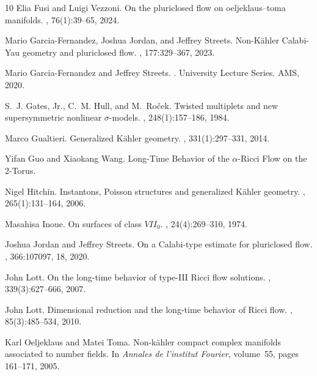 \documentclass[12pt]{amsart}
\numberwithin{equation}{section}
\numberwithin{prop}{section}
\theoremstyle{definition}
\begin{document}
\begin{thebibliography}{10}
Elia Fusi and Luigi Vezzoni.
\newblock On the pluriclosed flow on oeljeklaus--toma manifolds.
, 76(1):39--65, 2024.

Mario Garcia-Fernandez, Joshua Jordan, and Jeffrey Streets.
\newblock Non-K{\"a}hler Calabi-Yau geometry and pluriclosed flow.
, 177:329--367, 2023.

Mario Garcia-Fernandez and Jeffrey Streets.
.
\newblock University Lecture Series. AMS, 2020.

S.~J. Gates, Jr., C.~M. Hull, and M.~Ro\v{c}ek.
\newblock Twisted multiplets and new supersymmetric nonlinear {$\sigma$}-models.
, 248(1):157--186, 1984.

Marco Gualtieri.
\newblock Generalized {K}\"ahler geometry.
, 331(1):297--331, 2014.

Yifan Guo and Xiaokang Wang.
\newblock Long-Time Behavior of the $\alpha$-Ricci Flow on the 2-Torus.

Nigel Hitchin.
\newblock Instantons, {P}oisson structures and generalized {K}\"ahler geometry.
, 265(1):131--164, 2006.

Masahisa Inoue.
\newblock On surfaces of class $VII_0$.
, 24(4):269--310, 1974.

Joshua Jordan and Jeffrey Streets.
\newblock On a {C}alabi-type estimate for pluriclosed flow.
, 366:107097, 18, 2020.

John Lott.
\newblock On the long-time behavior of type-{III} {R}icci flow solutions.
, 339(3):627--666, 2007.

John Lott.
\newblock Dimensional reduction and the long-time behavior of {R}icci flow.
, 85(3):485--534, 2010.

Karl Oeljeklaus and Matei Toma.
\newblock Non-k{\"a}hler compact complex manifolds associated to number fields.
\newblock In {\em Annales de l'institut Fourier}, volume~55, pages 161--171, 2005.


\end{thebibliography}
\end{document}

